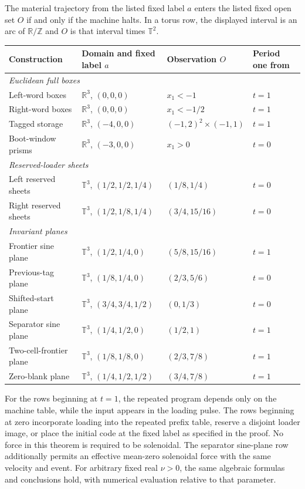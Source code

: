\begin{theorem}
The material trajectory from the listed fixed label $a$ enters the listed fixed open set $O$ if and only if the machine halts.  In a torus row, the displayed interval is an arc of $\mathbb R/\mathbb Z$ and $O$ is that interval times $\mathbb T^2$.
\begin{center}\footnotesize
\begin{tabular}{llll}
Construction&Domain and fixed label $a$&Observation $O$&Period one from\\\hline
\multicolumn{4}{l}{\emph{Euclidean full boxes}}\\
Left-word boxes&$\mathbb R^3$, $(0,0,0)$&$x_1<-1$&$t=1$\\
Right-word boxes&$\mathbb R^3$, $(0,0,0)$&$x_1<-1/2$&$t=1$\\
Tagged storage&$\mathbb R^3$, $(-4,0,0)$&$(-1,2)^2\times(-1,1)$&$t=1$\\
Boot-window prisms&$\mathbb R^3$, $(-3,0,0)$&$x_1>0$&$t=0$\\
\multicolumn{4}{l}{\emph{Reserved-loader sheets}}\\
Left reserved sheets&$\mathbb T^3$, $(1/2,1/2,1/4)$&$(1/8,1/4)$&$t=0$\\
Right reserved sheets&$\mathbb T^3$, $(1/2,1/8,1/4)$&$(3/4,15/16)$&$t=0$\\
\multicolumn{4}{l}{\emph{Invariant planes}}\\
Frontier sine plane&$\mathbb T^3$, $(1/2,1/4,0)$&$(5/8,15/16)$&$t=1$\\
Previous-tag plane&$\mathbb T^3$, $(1/8,1/4,0)$&$(2/3,5/6)$&$t=0$\\
Shifted-start plane&$\mathbb T^3$, $(3/4,3/4,1/2)$&$(0,1/3)$&$t=0$\\
Separator sine plane&$\mathbb T^3$, $(1/4,1/2,0)$&$(1/2,1)$&$t=1$\\
Two-cell-frontier plane&$\mathbb T^3$, $(1/8,1/8,0)$&$(2/3,7/8)$&$t=1$\\
Zero-blank plane&$\mathbb T^3$, $(1/4,1/2,1/2)$&$(3/4,7/8)$&$t=1$
\end{tabular}
\end{center}
For the rows beginning at $t=1$, the repeated program depends only on the machine table, while the input appears in the loading pulse.  The rows beginning at zero incorporate loading into the repeated prefix table, reserve a disjoint loader image, or place the initial code at the fixed label as specified in the proof.  No force in this theorem is required to be solenoidal.  The separator sine-plane row additionally permits an effective mean-zero solenoidal force with the same velocity and event. For arbitrary fixed real $\nu>0$, the same algebraic formulas and conclusions hold, with numerical evaluation relative to that parameter.
\end{theorem}

